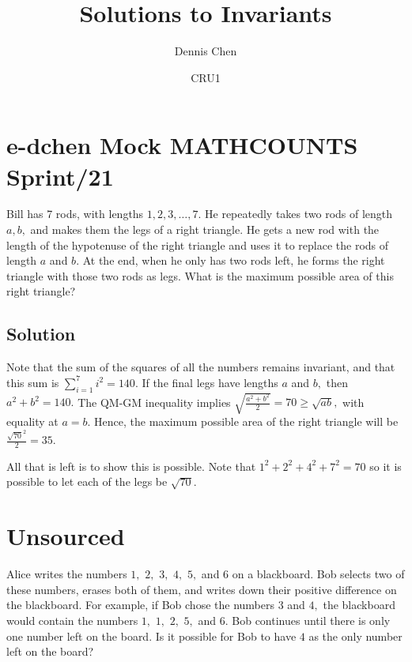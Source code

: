\documentclass{article}
\title{Solutions to Invariants}
\author{Dennis Chen}
\date{CRU1}
\begin{document}
\maketitle

{\hypersetup{
    citecolor=black,
    filecolor=black,
    linkcolor=black,
    urlcolor=black}\tableofcontents
}

\pagebreak\section{e-dchen Mock MATHCOUNTS Sprint/21}

Bill has 7 rods, with lengths $1,2,3,\dots,7.$ He repeatedly takes two rods of length $a,b,$ and makes them the legs of a right triangle. He gets a new rod with the length of the hypotenuse of the right triangle and uses it to replace the rods of length $a$ and $b.$ At the end, when he only has two rods left, he forms the right triangle with those two rods as legs. What is the maximum possible area of this right triangle?

\subsection{Solution}

Note that the sum of the squares of all the numbers remains invariant, and that this sum is $\displaystyle \sum_{i=1}^7 i^2 = 140$. If the final legs have lengths $a$ and $b,$ then $a^2+b^2=140.$ The QM-GM inequality implies $\sqrt{\frac{a^2+b^2}{2}}=70 \ge \sqrt{ab},$ with equality at $a=b$. Hence, the maximum possible area of the right triangle will be $\frac{\sqrt{70}^2}{2} = 35.$

All that is left is to show this is possible. Note that $1^2 + 2^2 + 4^2 + 7^2 = 70$ so it is possible to let each of the legs be $\sqrt{70}.$

\pagebreak\section{Unsourced}

Alice writes the numbers $1,$ $2,$ $3,$ $4,$ $5,$ and $6$ on a blackboard. Bob selects two of these numbers, erases both of them, and writes down their positive difference on the blackboard. For example, if Bob chose the numbers $3$ and $4,$ the blackboard would contain the numbers $1,$ $1,$ $2,$ $5,$ and $6.$ Bob continues until there is only one number left on the board. Is it possible for Bob to have $4$ as the only number left on the board?
\end{document}
